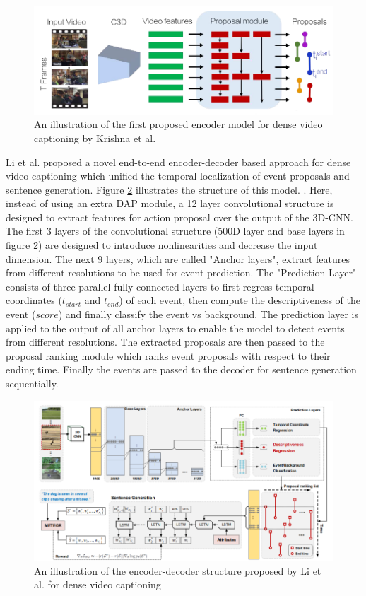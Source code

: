 \documentclass[preprint, 12pt]{elsarticle}
\begin{document}
		\begin{figure}[H]
			\centering
			\includegraphics[scale=0.5]{Imgs/dense1.png}
			\caption{An illustration of the first proposed encoder model for dense video captioning by Krishna et al. \cite{krishna2017dense}}
			\label{fig:dense1}
		\end{figure}
	
		Li et al. \cite{li2018jointly} proposed a novel end-to-end encoder-decoder based approach for dense video captioning which unified the temporal localization of event proposals and sentence generation\cite{li2018jointly}. Figure \ref{fig:dense2} illustrates the structure of this model. \cite{li2018jointly}. Here, instead of using an extra DAP module, a 12 layer convolutional structure is designed to extract features for action proposal over the output of the 3D-CNN. The first 3 layers of the convolutional structure (500D layer and base layers in figure \ref{fig:dense2}) are designed to introduce nonlinearities and decrease the input dimension. The next 9 layers, which are called "Anchor layers", extract features from different resolutions to be used for event prediction. The "Prediction Layer" consists of three parallel fully connected layers to first regress temporal coordinates ($t_{start}$ and $t_{end}$) of each event, then compute the descriptiveness of the event ($score$) and finally classify the event vs background. The prediction layer is applied to the output of all anchor layers to enable the model to detect events from different resolutions. The extracted proposals are then passed to the proposal ranking module which ranks event proposals with respect to their ending time. Finally the events are passed to the decoder for sentence generation sequentially.
		
		\begin{figure}[H]
			\centering
			\includegraphics[scale=0.5]{Imgs/dense2.png}
			\caption{An illustration of the encoder-decoder structure proposed by Li et al. for dense video captioning \cite{li2018jointly}}
			\label{fig:dense2}
		\end{figure}
	
\end{document}
